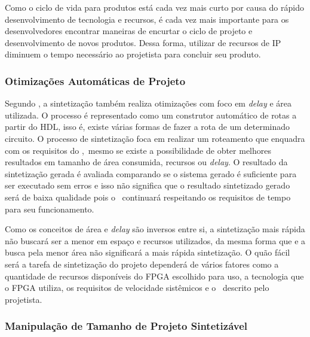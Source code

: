         Como o ciclo de vida para produtos está cada vez mais curto por causa do rápido desenvolvimento de tecnologia e recursos, é cada vez mais importante para os desenvolvedores encontrar maneiras de encurtar o ciclo de projeto e desenvolvimento de novos produtos.
        Dessa forma, utilizar de recursos de IP diminuem o tempo necessário ao projetista para concluir seu produto.
    
    
    
    \subsubsection{Otimizações Automáticas de Projeto}
    
        Segundo \citet{coffman1999real}, a sintetização também realiza otimizações com foco em \textit{delay} e área utilizada.
        O processo é representado como um construtor automático de rotas a partir do HDL, isso é, existe várias formas de fazer a rota de um determinado circuito.
        O processo de sintetização foca em realizar um roteamento que enquadra com os requisitos do \design,\ mesmo se existe a possibilidade de obter melhores resultados em tamanho de área consumida, recursos ou \textit{delay}.
        O resultado da sintetização gerada é avaliada comparando se o sistema gerado é suficiente para ser executado sem erros e isso não significa que o resultado sintetizado gerado será de baixa qualidade pois o \design\ continuará respeitando os requisitos de tempo para seu funcionamento.
        
        Como os conceitos de área e \textit{delay} são inversos entre si, a sintetização mais rápida não buscará ser a menor em espaço e recursos utilizados, da mesma forma que e a busca pela menor área não significará a mais rápida sintetização.
        O quão fácil será a tarefa de sintetização do projeto dependerá de vários fatores como a quantidade de recursos disponíveis do FPGA escolhido para uso, a tecnologia que o FPGA utiliza, os requisitos de velocidade sistêmicos e o \design\ descrito pelo projetista.
    
    
    \subsubsection{Manipulação de Tamanho de Projeto Sintetizável}
    

